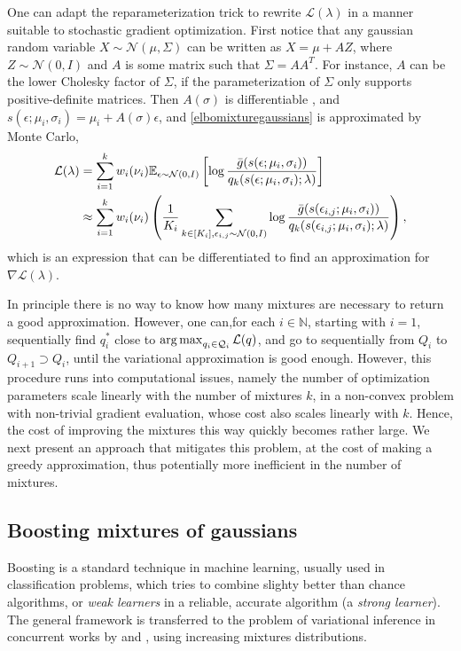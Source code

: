 One can adapt the reparameterization trick to rewrite $\mathcal{L}(\lambda)$ in a manner suitable to stochastic gradient optimization. First notice that any gaussian random variable $X \sim \mathcal{N}(\mu,\Sigma)$ can be written as $X = \mu + A Z$, where $Z \sim \mathcal{N}(0,I)$ and $A$ is some matrix such that $\Sigma = A A^T$. For instance, $A$ can be the lower Cholesky factor of $\Sigma$, if the parameterization of $\Sigma$ only supports positive-definite matrices. Then $A(\sigma)$ is differentiable \cite{Smith_1995,Murray_2016}, and $s(\epsilon;\mu_i,\sigma_i) = \mu_i + A(\sigma) \epsilon$, and \eqref{elbomixturegaussians} is approximated by Monte Carlo,
\begin{equation}\label{mcmixturegaussians}
\begin{split}
\mathcal{L}(\lambda) & = \sum_{i=1}^k w_i(\nu_i) {\mathbb E}_{\epsilon \sim \mathcal{N}(0,I)}\left[\log \frac{ {\bar{g}}(s(\epsilon;\mu_i,\sigma_i))}{q_k(s(\epsilon;\mu_i,\sigma_i);\lambda)}\right] \\
& \approx \sum_{i=1}^k w_i(\nu_i) \left( \frac{1}{K_i} \sum_{k \in [K_i], \epsilon_{i,j} \sim \mathcal{N}(0,I)} \log \frac{ {\bar{g}}(s(\epsilon_{i,j};\mu_i,\sigma_i))}{q_k(s(\epsilon_{i,j};\mu_i,\sigma_i);\lambda)} \right),
\end{split}
\end{equation}
which is an expression that can be differentiated to find an approximation for $\nabla \mathcal{L}(\lambda)$.

In principle there is no way to know how many mixtures are necessary to return a good approximation. However, one can,for each $i \in \mathbb{N}$, starting with $i = 1$, sequentially find $q^*_i$ close to $\operatorname*{arg\,max}_{q_i \in \mathcal{Q}_i} \mathcal{L}(q)$, and go to sequentially from $Q_i$ to $Q_{i+1} \supset Q_i$, until the variational approximation is good enough. However, this procedure runs into computational issues, namely the number of optimization parameters scale linearly with the number of mixtures $k$, in a non-convex problem with non-trivial gradient evaluation, whose cost also scales linearly with $k$. Hence, the cost of improving the mixtures this way quickly becomes rather large. We next present an approach that mitigates this problem, at the cost of making a greedy approximation, thus potentially more inefficient in the number of mixtures.

\subsection{Boosting mixtures of gaussians}\label{boostedvi_section}
Boosting \cite{Freund_1997,Freund_1999,Friedman_2000} is a standard technique in machine learning, usually used in classification problems, which tries to combine slighty better than chance algorithms, or \textit{weak learners} in a reliable, accurate algorithm (a \textit{strong learner}). The general framework is transferred to the problem of variational inference in concurrent works by \cite{Miller_2016} and \cite{Guo_2016}, using increasing mixtures distributions.

